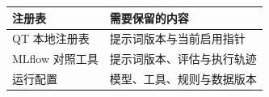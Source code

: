 \begin{tabular}{@{}P{4.0cm}P{8.5cm}@{}}
\toprule
\textbf{注册表} & \textbf{需要保留的内容} \\
\midrule
QT 本地注册表 & 提示词版本与当前启用指针 \\
MLflow 对照工具 & 提示词版本、评估与执行轨迹 \\
运行配置 & 模型、工具、规则与数据版本 \\
\bottomrule
\end{tabular}

